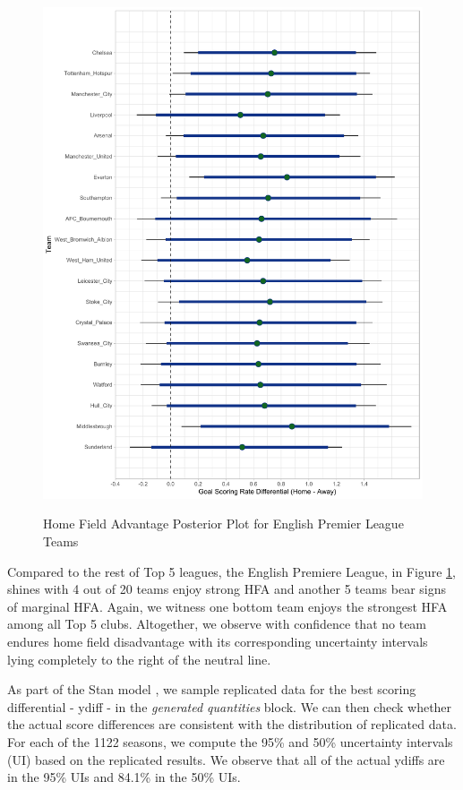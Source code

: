\documentclass[USenglish]{article}
\begin{document}
\begin{figure}
\caption{Home Field Advantage Posterior Plot for English Premier League Teams}
{\includegraphics[width=0.90\linewidth]{HFA_EPL11.pdf}}
\label{fig7}
\end{figure}

Compared to the rest of Top 5 leagues, the English Premiere League, in Figure \ref{fig7}, shines with 4 out of 20 teams enjoy strong HFA and another 5 teams bear signs of marginal HFA. Again, we witness one bottom team enjoys the strongest HFA among all Top 5 clubs. Altogether, we observe with confidence that no team endures home field disadvantage with its corresponding uncertainty intervals lying completely to the right of the neutral line.

As part of the Stan model \citep{team2015stan}, we sample replicated data for the best scoring differential - ydiff - in the \textit{generated quantities} block. We can then check whether the actual score differences are consistent with the distribution of replicated data. For each of the 1122 seasons, we compute the 95\% and 50\% uncertainty intervals (UI) based on the replicated results. We observe that all of the actual ydiffs are in the 95\% UIs and 84.1\% in the 50\% UIs.   
\end{document}
